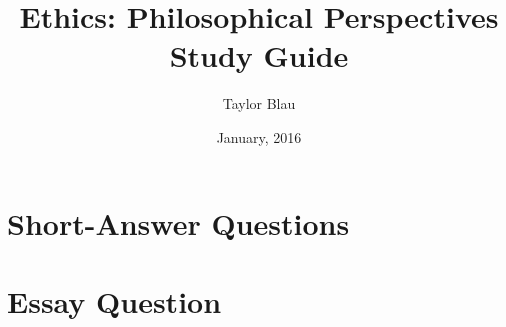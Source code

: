 \documentclass[12pt,letterpaper,titlepage]{book}
\title{Ethics: Philosophical Perspectives\\Study Guide}
\author{Taylor Blau}
\date{January, 2016}
\begin{document}
\maketitle
\tableofcontents

\chapter{Short-Answer Questions}






\chapter{Essay Question}

\end{document}
